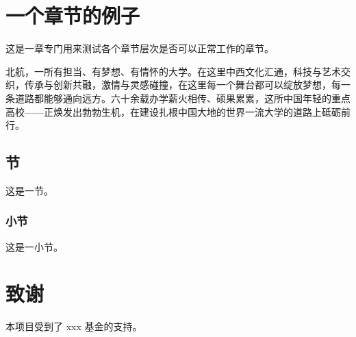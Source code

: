 \documentclass[lang=cn,12pt]{frbpaper}
\begin{document}
\section{一个章节的例子}

这是一章专门用来测试各个章节层次是否可以正常工作的章节。

北航，一所有担当、有梦想、有情怀的大学。在这里中西文化汇通，科技与艺术交织，传承与创新共融，激情与灵感碰撞，在这里每一个舞台都可以绽放梦想，每一条道路都能够通向远方。六十余载办学薪火相传、硕果累累，这所中国年轻的重点高校——正焕发出勃勃生机，在建设扎根中国大地的世界一流大学的道路上砥砺前行。  


\subsection{节}

这是一节。

\subsubsection{小节}

这是一小节。


\section*{致谢}

本项目受到了 xxx 基金的支持。

\clearpage
{}




\appendix
\addappheadtotoc
\end{document}
